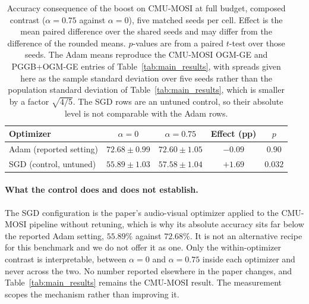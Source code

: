 \documentclass{article}
\begin{document}
\begin{table}[H]
\centering
\caption{Accuracy consequence of the boost on CMU-MOSI at full budget, composed contrast ($\alpha = 0.75$ against $\alpha = 0$), five matched seeds per cell. Effect is the mean paired difference over the shared seeds and may differ from the difference of the rounded means. $p$-values are from a paired $t$-test over those seeds. The Adam means reproduce the CMU-MOSI OGM-GE and PGGB+OGM-GE entries of Table~\ref{tab:main_results}, with spreads given here as the sample standard deviation over five seeds rather than the population standard deviation of Table~\ref{tab:main_results}, which is smaller by a factor $\sqrt{4/5}$. The SGD rows are an untuned control, so their absolute level is not comparable with the Adam rows.}
\label{tab:optimizer_accuracy}
\begin{tabular}{lcccc}
\toprule
\textbf{Optimizer} & \textbf{$\alpha = 0$} & \textbf{$\alpha = 0.75$} & \textbf{Effect (pp)} & \textbf{$p$} \\
\midrule
Adam (reported setting) & $72.68 \pm 0.99$ & $72.60 \pm 1.05$ & $-0.09$ & $0.90$ \\
SGD (control, untuned)  & $55.89 \pm 1.03$ & $57.58 \pm 1.04$ & $+1.69$ & $0.032$ \\
\bottomrule
\end{tabular}
\end{table}

\paragraph{What the control does and does not establish.} The SGD configuration is the paper's audio-visual optimizer applied to the CMU-MOSI pipeline without retuning, which is why its absolute accuracy sits far below the reported Adam setting, $55.89\%$ against $72.68\%$. It is not an alternative recipe for this benchmark and we do not offer it as one. Only the within-optimizer contrast is interpretable, between $\alpha = 0$ and $\alpha = 0.75$ inside each optimizer and never across the two. No number reported elsewhere in the paper changes, and Table~\ref{tab:main_results} remains the CMU-MOSI result. The measurement scopes the mechanism rather than improving it.
\end{document}
